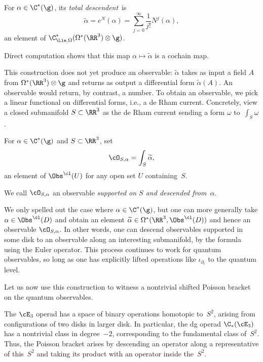 \documentclass[10pt]{amsart}
\begin{document}
\begin{dfn}
For $\alpha \in \C^*(\g)$, its {\em total descendent}~is
\[
\widetilde{\alpha} = e^{N}(\alpha) = \sum_{j=0}^\infty \frac{1}{j!}N^j(\alpha),
\]
an element of $\C^*_{\Lie, \Omega}(\Omega^*(\RR^3) \otimes \g)$.
\end{dfn}

Direct computation shows that this map $\alpha \mapsto \widetilde{\alpha}$ is a cochain map.

This construction does not yet produce an observable:
$\widetilde{\alpha}$ takes as input a field $A$ from $\Omega^*(\RR^3) \otimes \g$ and returns as output a differential form $\widetilde{\alpha}(A)$.
An observable would return, by contrast, a number.
To obtain an observable, we pick a linear functional on differential forms, i.e., a de Rham current.
Concretely, view a closed submanifold $S \subset \RR^3$ as the de Rham current sending a form $\omega$ to~$\int_S \omega$.

\begin{dfn}
For $\alpha \in \C^*(\g)$ and $S \subset \RR^3$, set
\[
\cO_{S,\alpha} = \int_S \widetilde{\alpha},
\]
an element of $\Obs^\cl(U)$ for any open set $U$ containing~$S$.
\end{dfn}

We call $\cO_{S,\alpha}$ an observable {\em supported on $S$ and descended from~$\alpha$}.

\begin{rmk}
We only spelled out the case where $\alpha \in \C^*(\g)$, but one can more generally take $\alpha \in \Obs^\cl(D)$ and obtain an element $\widetilde{\alpha} \in \Omega^*(\RR^3, \Obs^\cl(D))$ and hence an observable $\cO_{S,\alpha}$.
In other words, one can descend observables supported in some disk to an observable along an interesting submanifold,
by the formula using the Euler operator.
This process continues to work for quantum observables, so long as one has explicitly lifted operations like $\iota_{\partial_i}$ to the quantum level.
\end{rmk}

Let us now use this construction to witness a nontrivial shifted Poisson bracket on the quantum observables.

The $\cE_3$ operad has a space of binary operations homotopic to~$S^2$,
arising from configurations of two disks in larger disk.
In particular, the dg operad $\C_*(\cE_3)$ has a nontrivial class in degree~$-2$, corresponding to the fundamental class of~$S^2$.
Thus, the Poisson bracket arises by descending an operator along a representative of this~$S^2$ and taking its product with an operator inside the~$S^2$.
\end{document}
